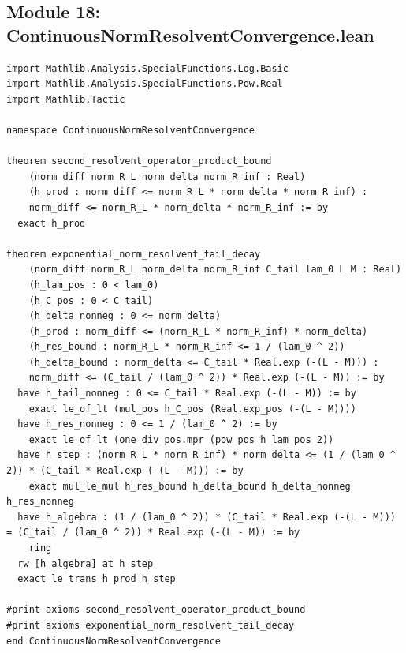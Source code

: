 \documentclass[11pt,a4paper]{article}
\begin{document}
\subsection{Module 18: ContinuousNormResolventConvergence.lean}
\begin{lstlisting}[language=Lean4]
import Mathlib.Analysis.SpecialFunctions.Log.Basic
import Mathlib.Analysis.SpecialFunctions.Pow.Real
import Mathlib.Tactic

namespace ContinuousNormResolventConvergence

theorem second_resolvent_operator_product_bound
    (norm_diff norm_R_L norm_delta norm_R_inf : Real)
    (h_prod : norm_diff <= norm_R_L * norm_delta * norm_R_inf) :
    norm_diff <= norm_R_L * norm_delta * norm_R_inf := by
  exact h_prod

theorem exponential_norm_resolvent_tail_decay
    (norm_diff norm_R_L norm_delta norm_R_inf C_tail lam_0 L M : Real)
    (h_lam_pos : 0 < lam_0)
    (h_C_pos : 0 < C_tail)
    (h_delta_nonneg : 0 <= norm_delta)
    (h_prod : norm_diff <= (norm_R_L * norm_R_inf) * norm_delta)
    (h_res_bound : norm_R_L * norm_R_inf <= 1 / (lam_0 ^ 2))
    (h_delta_bound : norm_delta <= C_tail * Real.exp (-(L - M))) :
    norm_diff <= (C_tail / (lam_0 ^ 2)) * Real.exp (-(L - M)) := by
  have h_tail_nonneg : 0 <= C_tail * Real.exp (-(L - M)) := by
    exact le_of_lt (mul_pos h_C_pos (Real.exp_pos (-(L - M))))
  have h_res_nonneg : 0 <= 1 / (lam_0 ^ 2) := by
    exact le_of_lt (one_div_pos.mpr (pow_pos h_lam_pos 2))
  have h_step : (norm_R_L * norm_R_inf) * norm_delta <= (1 / (lam_0 ^ 2)) * (C_tail * Real.exp (-(L - M))) := by
    exact mul_le_mul h_res_bound h_delta_bound h_delta_nonneg h_res_nonneg
  have h_algebra : (1 / (lam_0 ^ 2)) * (C_tail * Real.exp (-(L - M))) = (C_tail / (lam_0 ^ 2)) * Real.exp (-(L - M)) := by
    ring
  rw [h_algebra] at h_step
  exact le_trans h_prod h_step

#print axioms second_resolvent_operator_product_bound
#print axioms exponential_norm_resolvent_tail_decay
end ContinuousNormResolventConvergence
\end{lstlisting}
\end{document}
